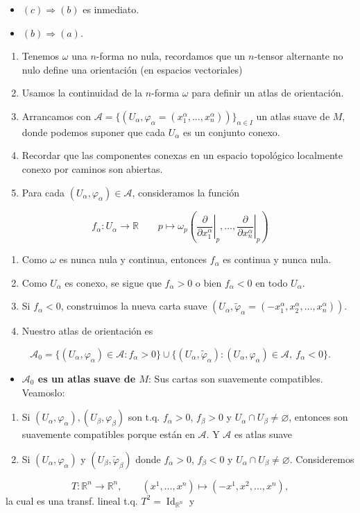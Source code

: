 \begin{bookproof}{}
\begin{itemize}
\item \textbf{$(c)\Rightarrow(b)$} es inmediato.
\item \textbf{$(b)\Rightarrow(a)$}.
\end{itemize}
\begin{enumerate}
\item Tenemos $\omega$ una $n$-forma no nula, recordamos que un $n$-tensor alternante no nulo define una orientación (en espacios vectoriales)
\item Usamos la continuidad de la $n$-forma $\omega$ para definir un atlas de orientación.
\item Arrancamos con $\mathcal A=\{(U_\alpha,\varphi_\alpha=(x_1^\alpha,\ldots,x_n^\alpha))\}_{\alpha\in I}$ un atlas suave de $M$, donde podemos suponer que cada $U_\alpha$ es un conjunto conexo.
\item Recordar que las componentes conexas en un espacio topológico localmente conexo por caminos son abiertas.
\item Para cada $(U_\alpha,\varphi_\alpha)\in\mathcal A$, consideramos la función
\end{enumerate}
\[
f_\alpha:U_\alpha\to\mathbb R\qquad p\mapsto \omega_p\!\left(\left.\frac{\partial}{\partial x_1^\alpha}\right|_p,\ldots,\left.\frac{\partial}{\partial x_n^\alpha}\right|_p\right)
\]
\begin{enumerate}[start=6]
\item Como $\omega$ es nunca nula y continua, entonces $f_\alpha$ es continua y nunca nula.
\item Como $U_\alpha$ es conexo, se sigue que $f_\alpha>0$ o bien $f_\alpha<0$ en todo $U_\alpha$.
\item Si $f_\alpha<0$, construimos la nueva carta suave $(U_\alpha,\widetilde\varphi_\alpha=(-x_1^\alpha,x_2^\alpha,\ldots,x_n^\alpha))$.
\item Nuestro atlas de orientación es
\end{enumerate}
\[
\mathcal A_0=\{(U_\alpha,\varphi_\alpha)\in\mathcal A:f_\alpha>0\}\cup\{(U_\alpha,\widetilde\varphi_\alpha):(U_\alpha,\varphi_\alpha)\in\mathcal A,\ f_\alpha<0\}.
\]
\begin{itemize}
\item \textbf{$\mathcal A_0$ es un atlas suave de $M$}: Sus cartas son suavemente compatibles. Veamoslo:
\end{itemize}
\begin{enumerate}
\item Si $(U_\alpha,\varphi_\alpha),(U_\beta,\varphi_\beta)$ son t.q. $f_\alpha>0$, $f_\beta>0$ y $U_\alpha\cap U_\beta\neq\varnothing$, entonces son suavemente compatibles porque están en $\mathcal A$. Y $\mathcal A$ es atlas suave
\item Si $(U_\alpha,\varphi_\alpha)$ y $(U_\beta,\widetilde\varphi_\beta)$ donde $f_\alpha>0$, $f_\beta<0$ y $U_\alpha\cap U_\beta\neq\varnothing$. Consideremos
\end{enumerate}
\[
T:\mathbb R^n\to\mathbb R^n,\qquad (x^1,\ldots,x^n)\mapsto(-x^1,x^2,\ldots,x^n),
\]
la cual es una transf. lineal t.q. $T^2=\operatorname{Id}_{\mathbb R^n}$ y


\end{bookproof}
